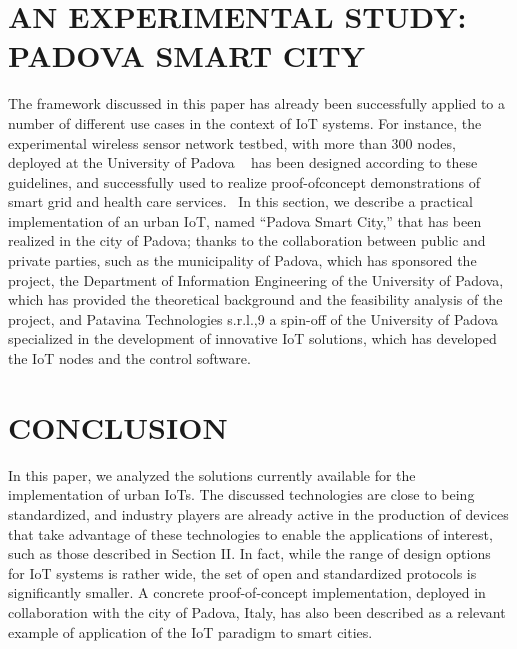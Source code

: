 \documentclass[conference,column]{IEEEtran}
\begin{document}
\section{AN EXPERIMENTAL STUDY: PADOVA SMART CITY}
The framework discussed in this paper has already been
successfully applied to a number of different use cases in the context of IoT systems. For instance, the experimental wireless sensor network testbed, with more than 300 nodes, deployed at the University of Padova ~\cite{r7} has been designed according to these guidelines, and successfully used to realize proof-ofconcept demonstrations of smart grid and health care services.~\cite{r8}
In this section, we describe a practical implementation of an urban IoT, named “Padova Smart City,” that has been realized in the city of Padova; thanks to the collaboration between public and private parties, such as the municipality of Padova, which has sponsored the project, the Department of Information Engineering
of the University of Padova, which has provided the
theoretical background and the feasibility analysis of the project, and Patavina Technologies s.r.l.,9 a spin-off of the University of Padova specialized in the development of innovative IoT solutions, which has developed the IoT nodes and the control software.~\cite{r9}












\section{CONCLUSION}
In this paper, we analyzed the solutions currently available for the implementation of urban IoTs. The discussed technologies are close to being standardized, and industry players are already active in the production of devices that take advantage of these technologies to enable the applications of interest, such as those described in Section II. In fact, while the range of design options for IoT systems is rather wide, the set of open and standardized protocols is significantly smaller. A concrete proof-of-concept implementation, deployed in collaboration with the city of Padova, Italy, has also been described as a relevant example of application of the IoT paradigm to smart cities.

	 
	
\end{document}

